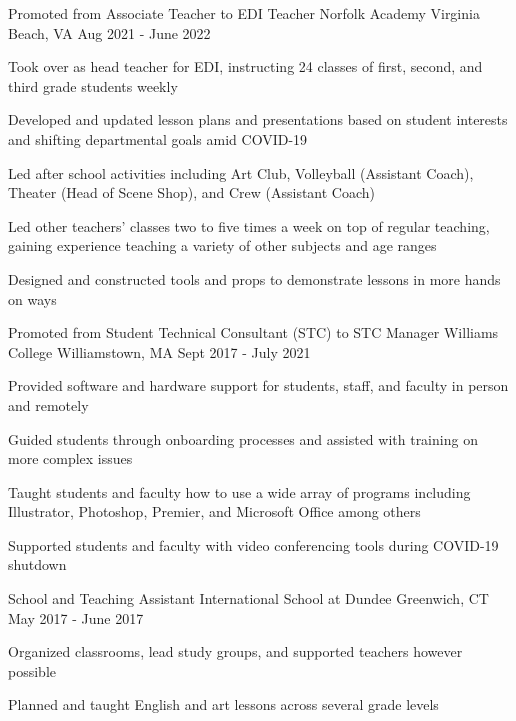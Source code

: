 \begin{cventries}
    \cventry
    {Promoted from Associate Teacher to EDI Teacher}
    {Norfolk Academy}
    {Virginia Beach, VA}
    {Aug 2021 - June 2022}
    {
      \begin{cvitems}
        \item {Took over as head teacher for EDI, instructing 24 classes of first, second, and third grade students weekly}
        \item {Developed and updated lesson plans and presentations based on student interests and shifting departmental goals amid COVID-19}
        \item {Led after school activities including Art Club, Volleyball (Assistant Coach), Theater (Head of Scene Shop), and Crew (Assistant Coach)}
        \item{Led other teachers' classes two to five times a week on top of regular teaching, gaining experience teaching a variety of other subjects and age ranges}
        \item{Designed and constructed tools and props to demonstrate lessons in more hands on ways}
      \end{cvitems}
    }
    \cventry
    {Promoted from Student Technical Consultant (STC) to STC Manager}
    {Williams College}
    {Williamstown, MA}
    {Sept 2017 - July 2021}
    {
      \begin{cvitems}
        \item {Provided software and hardware support for students, staff, and faculty in person and remotely}
        \item {Guided students through onboarding processes and assisted with training on more complex issues}
        \item {Taught students and faculty how to use a wide array of programs including Illustrator, Photoshop, Premier, and Microsoft Office among others}
        \item{Supported students and faculty with video conferencing tools during COVID-19 shutdown}
      \end{cvitems}
    }

       \cventry
   {School and Teaching Assistant}
   {International School at Dundee}
   {Greenwich, CT}
   {May 2017 - June 2017}
   {
      \begin{cvitems}
      \item{Organized classrooms, lead study groups, and supported teachers however possible}
      \item{Planned and taught English and art lessons across several grade levels}
      \end{cvitems}
    }
\end{cventries}
